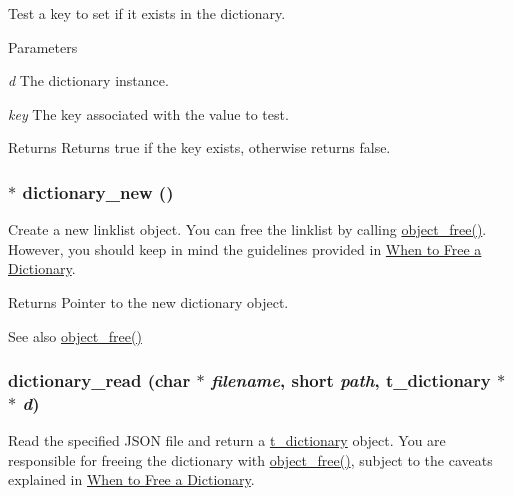 Test a key to set if it exists in the dictionary. 
\begin{DoxyParams}{Parameters}
\item[{\em d}]The dictionary instance. \item[{\em key}]The key associated with the value to test. \end{DoxyParams}
\begin{DoxyReturn}{Returns}
Returns true if the key exists, otherwise returns false. 
\end{DoxyReturn}
\hypertarget{group__dictionary_ga9d89ea4cf5b0aaf87fba6027c3ec223c}{
\subsubsection[{dictionary\_\-new}]{$\ast$ dictionary\_\-new ()}}
\label{group__dictionary_ga9d89ea4cf5b0aaf87fba6027c3ec223c}


Create a new linklist object. You can free the linklist by calling \hyperlink{group__obj_ga3759846cb356195532c41e35b87522ee}{object\_\-free()}. However, you should keep in mind the guidelines provided in \hyperlink{group__dictionary_when_to_free_a_dictionary}{When to Free a Dictionary}.

\begin{DoxyReturn}{Returns}
Pointer to the new dictionary object.
\end{DoxyReturn}
\begin{DoxySeeAlso}{See also}
\hyperlink{group__obj_ga3759846cb356195532c41e35b87522ee}{object\_\-free()} 
\end{DoxySeeAlso}
\hypertarget{group__dictionary_ga2c64f2e3bce940ca992b3dd3ffe292ac}{
\subsubsection[{dictionary\_\-read}]{ dictionary\_\-read (char $\ast$ {\em filename}, \/  short {\em path}, \/  {\bf t\_\-dictionary} $\ast$$\ast$ {\em d})}}
\label{group__dictionary_ga2c64f2e3bce940ca992b3dd3ffe292ac}


Read the specified JSON file and return a \hyperlink{structt__dictionary}{t\_\-dictionary} object. You are responsible for freeing the dictionary with \hyperlink{group__obj_ga3759846cb356195532c41e35b87522ee}{object\_\-free()}, subject to the caveats explained in \hyperlink{group__dictionary_when_to_free_a_dictionary}{When to Free a Dictionary}.


